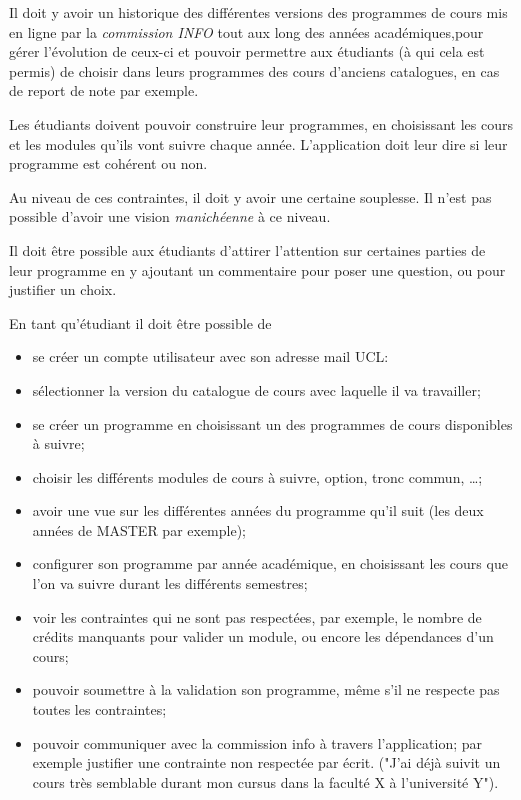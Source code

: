Il doit y avoir un historique des différentes versions des programmes de cours mis en ligne par la \textit{commission INFO} tout aux long des années académiques,pour gérer l'évolution de ceux-ci et pouvoir permettre aux étudiants (à qui cela est permis) de choisir dans leurs programmes des cours d'anciens catalogues, en cas de report de note par exemple.
 
Les étudiants doivent pouvoir construire leur programmes, en choisissant les cours et les modules qu'ils vont suivre chaque année. L'application doit leur dire si leur programme est cohérent ou non.

Au niveau de ces contraintes, il doit y avoir une certaine souplesse. Il n'est pas possible d'avoir une vision \textit{manichéenne} à ce niveau.

Il doit être possible aux étudiants d'attirer l'attention sur certaines parties de leur programme en y ajoutant un commentaire pour poser une question, ou pour justifier un choix.

En tant qu'étudiant il doit être possible de
\begin{itemize}
\item se créer un compte utilisateur avec son adresse mail UCL:
\item sélectionner la version du catalogue de cours avec laquelle il va travailler;
\item se créer un programme en choisissant un des programmes de cours disponibles à suivre;
\item choisir les différents modules de cours à suivre, option, tronc commun, \ldots ;
\item avoir une vue sur les différentes années du programme qu'il suit (les deux années de MASTER par exemple);
\item configurer son programme par année académique, en choisissant les cours que l'on va suivre durant les différents semestres;
\item voir les contraintes qui ne sont pas respectées, par exemple, le nombre de crédits manquants pour valider un module, ou encore les dépendances d'un cours;
\item pouvoir soumettre à la validation son programme, même s'il ne respecte pas toutes les contraintes;
\item pouvoir communiquer avec la commission info à travers l'application; par exemple justifier une contrainte non respectée par écrit. ("J'ai déjà suivit un cours très semblable durant mon cursus dans la faculté X à l'université Y").  
\end{itemize}

